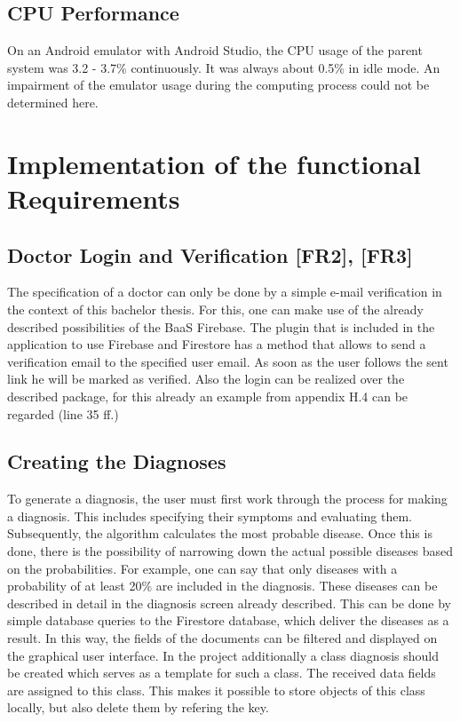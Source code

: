 \subsection{CPU Performance}
On an Android emulator with Android Studio, the CPU usage of the parent system was 3.2 - 3.7\% continuously. It was always about 0.5\% in idle mode. An impairment of the emulator usage during the computing process could not be determined here.
  
\section{Implementation of the functional Requirements}
\subsection{Doctor Login and Verification [FR2], [FR3]}
The specification of a doctor can only be done by a simple e-mail verification in the context of this bachelor thesis. For this, one can make use of the already described possibilities of the BaaS Firebase. The plugin that is included in the application to use Firebase and Firestore has a method that allows to send a verification email to the specified user email. As soon as the user follows the sent link he will be marked as verified. Also the login can be realized over the described package, for this already an example from appendix H.4 can be regarded (line 35 ff.)
\subsection{Creating the Diagnoses}
To generate a diagnosis, the user must first work through the process for making a diagnosis. This includes specifying their symptoms and evaluating them. Subsequently, the algorithm calculates the most probable disease. Once this is done, there is the possibility of narrowing down the actual possible diseases based on the probabilities. For example, one can say that only diseases with a probability of at least 20\% are included in the diagnosis. These diseases can be described in detail in the diagnosis screen already described. This can be done by simple database queries to the Firestore database, which deliver the diseases as a result. In this way, the fields of the documents can be filtered and displayed on the graphical user interface. In the project additionally a class diagnosis should be created which serves as a template for such a class. The received data fields are assigned to this class. This makes it possible to store objects of this class locally, but also delete them by refering the key.
